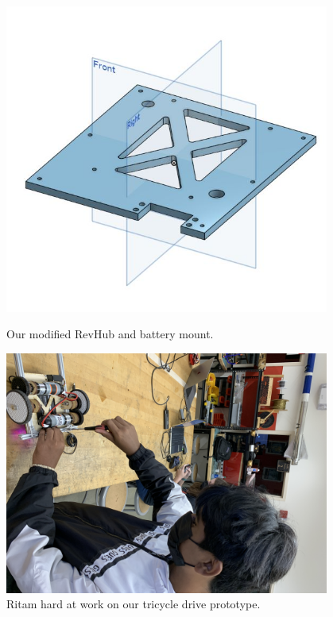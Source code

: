 \begin{figure}[ht]
\centering
\begin{minipage}[b]{.48\textwidth}
  \centering
  \includegraphics[width=0.95\textwidth]{Meetings/October/10-10-21/10-10-2021_Hardware_Figure1 - Nathan Forrer.JPG}
  \caption{Our modified RevHub and battery mount.}
  \label{fig:101021_1}
\end{minipage}%
\hfill%
\begin{minipage}[b]{.48\textwidth}
  \centering
  \includegraphics[width=0.95\textwidth]{Meetings/October/10-10-21/10-10-2021_Hardware_Figure2 - Nathan Forrer.JPG}
  \caption{Ritam hard at work on our tricycle drive prototype.}
  \label{fig:101021_2}
\end{minipage}
\end{figure}






